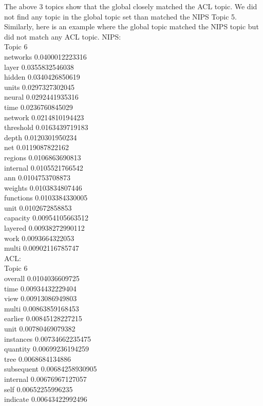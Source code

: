 \documentclass{article}
\begin{document}
{The above 3 topics show that the global closely matched the ACL topic. We did not find any topic in the global topic set than matched the NIPS Topic 5.
Similarly, here is an example where the global topic matched the NIPS topic but did not match any ACL topic.
NIPS:\\
Topic 6\\
networks 0.0400012223316\\
layer 0.0355832546038\\
hidden 0.0340426850619\\
units 0.0297327302045\\
neural 0.0292441935316\\
time 0.0236760845029\\
network 0.0214810194423\\
threshold 0.0163439719183\\
depth 0.0120301950234\\
net 0.0119087822162\\
regions 0.0106863690813\\
internal 0.0105521766542\\
ann 0.0104753708873\\
weights 0.0103834807446\\
functions 0.0103384330005\\
unit 0.0102672858853\\
capacity 0.00954105663512\\
layered 0.00938272990112\\
work 0.0093664322053\\
multi 0.00902116785747\\
ACL:\\
Topic 6\\
overall 0.0104036609725\\
time 0.00934432229404\\
view 0.00913086949803\\
multi 0.00863859168453\\
earlier 0.00845128227215\\
unit 0.00780469079382\\
instances 0.00734662235475\\
quantity 0.00699236194259\\
tree 0.0068684134886\\
subsequent 0.00684258930905\\
internal 0.00676967127057\\
self 0.00652255996235\\
indicate 0.00643422992496\\
}
\end{document}
